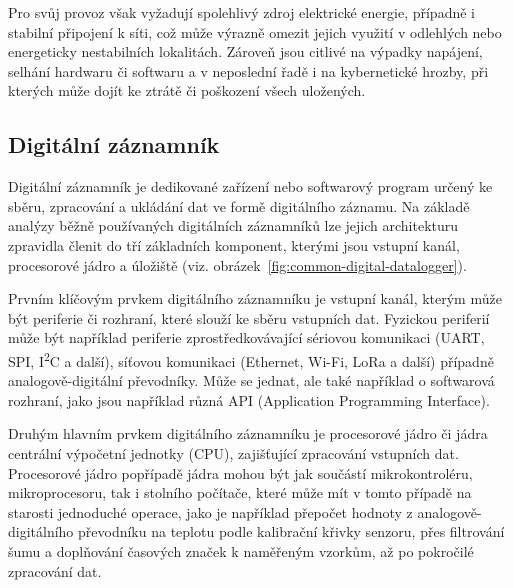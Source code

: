 Pro svůj provoz však vyžadují spolehlivý zdroj elektrické energie, případně i stabilní připojení k síti, což může výrazně omezit jejich využití v odlehlých nebo energeticky nestabilních lokalitách. Zároveň jsou citlivé na výpadky napájení, selhání hardwaru či softwaru a v neposlední řadě i na kybernetické hrozby, při kterých může dojít ke ztrátě či poškození všech uložených. \cite{rcp_analog_vs_digital}

\subsection{Digitální záznamník}
\label{digitalni_zaznamik}
Digitální záznamník je dedikované zařízení nebo softwarový program určený ke sběru, zpracování a ukládání dat ve formě digitálního záznamu. Na základě analýzy běžně používaných digitálních záznamníků lze jejich architekturu zpravidla členit do tří základních komponent, kterými jsou vstupní kanál, procesorové jádro a úložiště (viz. obrázek~\ref{fig:common-digital-datalogger}). \cite{researchgate_general_dataloggger_multiple_sdcards, ieee_digital_sound_recorder_arm_sd_card, ieee_multi_connectivity_datalogger_sd_card}

Prvním klíčovým prvkem digitálního záznamníku je vstupní kanál, kterým může být periferie či rozhraní, které slouží ke sběru vstupních dat. Fyzickou periferií může být například periferie zprostředkovávající sériovou komunikaci (UART, SPI, I\textsuperscript{2}C a další), síťovou komunikaci (Ethernet, Wi-Fi, LoRa a další) případně analogově-digitální převodníky. Může se jednat, ale také například o softwarová rozhraní, jako jsou například různá API (Application Programming Interface). \cite{fourcore_win_process_birth, ieee_digital_sound_recorder_arm_sd_card}

Druhým hlavním prvkem digitálního záznamníku je procesorové jádro či jádra centrální výpočetní jednotky (CPU), zajišťující zpracování vstupních dat. Procesorové jádro popřípadě jádra mohou být jak součástí mikrokontroléru, mikroprocesoru, tak i stolního počítače, které může mít v tomto případě na starosti jednoduché operace, jako je například přepočet hodnoty z analogově-digitálního převodníku na teplotu podle kalibrační křivky senzoru, přes filtrování šumu a doplňování časových značek k naměřeným vzorkům, až po pokročilé zpracování dat. \cite{springer_development_ECG_recorder}


